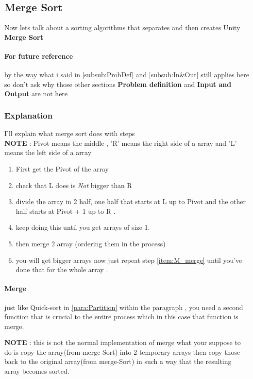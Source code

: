\documentclass{article}
\begin{document}
\subsection{Merge Sort}
Now lets talk about a sorting algorithms that separates and then creates Unity \textbf{Merge Sort}

\paragraph{For future reference}\label{par:future Ref} by the way what i said in  \autoref{subsub:ProbDef}
 and \autoref{subsub:In&Out} still applies here so don't ask why those other sections \textbf{Problem definition} and \textbf{Input and Output} are not here 
\subsubsection{Explanation}
I'll explain what merge sort does with steps \\
\textbf{NOTE} : Pivot means the middle , 'R' means the right side of a array and 'L' means the left side of a array 
\begin{enumerate}
\item First get the Pivot of the array 
\item check that L does is \textit{Not} bigger than R 
\item divide the array in 2 half, one half that starts at L up to Pivot and the other half starts at Pivot + 1 up to R . 
\item keep doing this until you get arrays of size 1.
\item then merge 2 array (ordering them in the process) \label{item:M_merge}
\item you will get bigger arrays now just repeat step \ref{item:M_merge} until you've done that for the whole array .
\end{enumerate}
\paragraph{Merge} just like Quick-sort in \autoref{para:Partition} within the paragraph , you need a second function that is crucial to the entire process which in this case that function is merge.


\textbf{NOTE} : this is not the normal implementation of merge what your suppose to do is copy the array(from merge-Sort) into 2 temporary arrays then copy those back to the original array(from merge-Sort) in such a way that the resulting array becomes sorted.
\end{document}
